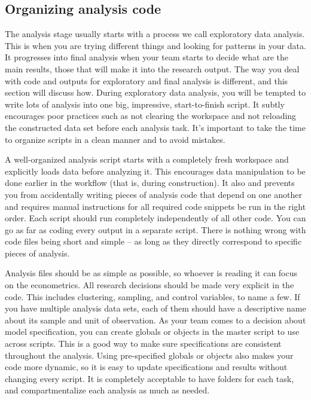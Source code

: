 \subsection{Organizing analysis code}

The analysis stage usually starts with a process we call exploratory data analysis.
This is when you are trying different things and looking for patterns in your data. 
It progresses into final analysis when your team starts to decide what are the main results, those that will make it into the research output.
The way you deal with code and outputs for exploratory and final analysis is different, and this section will discuss how.
During exploratory data analysis, you will be tempted to write lots of analysis into one big, impressive, start-to-finish script. 
It subtly encourages poor practices such as not clearing the workspace and not reloading the constructed data set before each analysis task. 
It's important to take the time to organize scripts in a clean manner and to avoid mistakes.

A well-organized analysis script starts with a completely fresh workspace and explicitly loads data before analyzing it.
This encourages data manipulation to be done earlier in the workflow (that is, during construction).
It also and prevents you from accidentally writing pieces of analysis code that depend on one another and requires manual instructions for all required code snippets be run in the right order.
Each script should run completely independently of all other code.
You can go as far as coding every output in a separate script.
There is nothing wrong with code files being short and simple -- as long as they directly correspond to specific pieces of analysis.

Analysis files should be as simple as possible, so whoever is reading it can focus on the econometrics.
All research decisions should be made very explicit in the code.
This includes clustering, sampling, and control variables, to name a few. 
If you have multiple analysis data sets, each of them should have a descriptive name about its sample and unit of observation.
As your team comes to a decision about model specification, you can create globals or objects in the master script to use across scripts.
This is a good way to make sure specifications are consistent throughout the analysis. 
Using pre-specified globals or objects also makes your code more dynamic, so it is easy to update specifications and results without changing every script.
It is completely acceptable to have folders for each task, and compartmentalize each analysis as much as needed.

